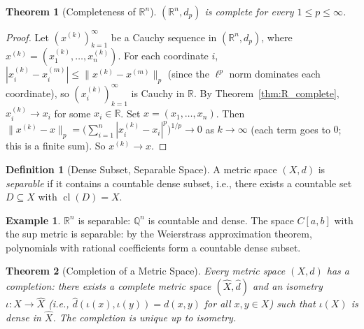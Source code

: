 \documentclass[11pt,a4paper]{article}
\theoremstyle{definition}
\newtheorem{definition}{Definition}[section]
\newtheorem{example}{Example}[section]
\theoremstyle{plain}
\newtheorem{theorem}{Theorem}[section]
\theoremstyle{remark}
\newcommand{\R}{\mathbb{R}}
\newcommand{\Q}{\mathbb{Q}}
\DeclareMathOperator{\cl}{cl}
\begin{document}
\begin{theorem}[Completeness of $\R^n$]
\label{thm:Rn_complete}
$(\R^n, d_p)$ is complete for every $1 \le p \le \infty$.
\end{theorem}

\begin{proof}
Let $(x^{(k)})_{k=1}^\infty$ be a Cauchy sequence in $(\R^n, d_p)$, where
$x^{(k)} = (x_1^{(k)}, \ldots, x_n^{(k)})$. For each coordinate $i$,
$|x_i^{(k)} - x_i^{(m)}| \le \|x^{(k)} - x^{(m)}\|_p$ (since the $\ell^p$ norm
dominates each coordinate), so $(x_i^{(k)})_{k=1}^\infty$ is Cauchy in $\R$.
By Theorem~\ref{thm:R_complete}, $x_i^{(k)} \to x_i$ for some $x_i \in \R$.
Set $x = (x_1, \ldots, x_n)$. Then
$\|x^{(k)} - x\|_p = \bigl(\sum_{i=1}^n |x_i^{(k)} - x_i|^p\bigr)^{1/p} \to 0$
as $k \to \infty$ (each term goes to $0$; this is a finite sum). So $x^{(k)} \to x$.
\end{proof}

\begin{definition}[Dense Subset, Separable Space]
\label{def:separable}
A metric space $(X,d)$ is \emph{separable} if it contains a countable dense subset,
i.e., there exists a countable set $D \subseteq X$ with $\cl(D) = X$.
\end{definition}

\begin{example}
$\R^n$ is separable: $\Q^n$ is countable and dense. The space $C[a,b]$ with the
sup metric is separable: by the Weierstrass approximation theorem, polynomials with
rational coefficients form a countable dense subset.
\end{example}

\begin{theorem}[Completion of a Metric Space]
\label{thm:completion}
Every metric space $(X,d)$ has a \emph{completion}: there exists a complete metric
space $(\hat{X}, \hat{d})$ and an isometry $\iota \colon X \to \hat{X}$ (i.e.,
$\hat{d}(\iota(x), \iota(y)) = d(x,y)$ for all $x, y \in X$) such that
$\iota(X)$ is dense in $\hat{X}$. The completion is unique up to isometry.
\end{theorem}
\end{document}
